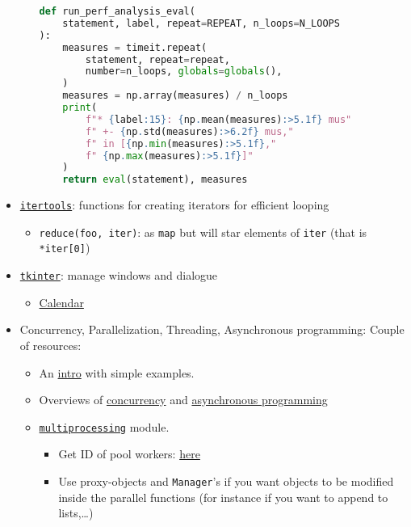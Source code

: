 \documentclass[a4paper,12pt,%
              final%
              ]{article}
\begin{document}
\begin{itemize}
\begin{itemize}
\begin{lstlisting}[language=python]
def run_perf_analysis_eval(
    statement, label, repeat=REPEAT, n_loops=N_LOOPS
):
    measures = timeit.repeat(
        statement, repeat=repeat,
        number=n_loops, globals=globals(),
    )
    measures = np.array(measures) / n_loops
    print(
        f"* {label:15}: {np.mean(measures):>5.1f} mus"
        f" +- {np.std(measures):>6.2f} mus,"
        f" in [{np.min(measures):>5.1f},"
        f" {np.max(measures):>5.1f}]"
    )
    return eval(statement), measures
\end{lstlisting}
    \end{itemize}
  \item \href{https://docs.python.org/3/library/itertools.html}{\texttt{itertools}}: functions for creating iterators for efficient looping
    \begin{itemize}
      \item \verb|reduce(foo, iter)|: as \texttt{map} but will star elements of \texttt{iter} (that is \verb|*iter[0]|)
    \end{itemize}
  \item \href{https://docs.python.org/3/library/tkinter.html}{\texttt{tkinter}}: manage windows and dialogue
    \begin{itemize}
      \item \href{https://tkcalendar.readthedocs.io/en/stable/index.html}{Calendar}
    \end{itemize}
  \item Concurrency, Parallelization, Threading, Asynchronous programming: Couple of resources:
    \begin{itemize}
      \item An \href{https://www.machinelearningplus.com/python/parallel-processing-python/}{intro} with simple examples.
      \item Overviews of \href{https://realpython.com/python-concurrency/}{concurrency} and \href{https://realpython.com/async-io-python/}{asynchronous programming}
      \item \href{https://docs.python.org/3/library/multiprocessing.html}{\texttt{multiprocessing}} module.
        \begin{itemize}
          \item Get ID of pool workers: \href{https://stackoverflow.com/questions/10190981/get-a-unique-id-for-worker-in-python-multiprocessing-pool}{here}
          \item Use proxy-objects and \texttt{Manager}'s if you want objects to be modified inside the parallel functions (for instance if you want to append to lists,\ldots)

\end{itemize}
\end{itemize}
\end{itemize}
\end{document}

